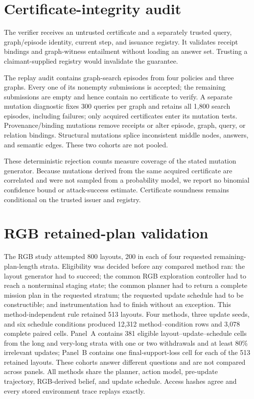 \documentclass{article}
\begin{document}
\section{Certificate-integrity audit}
\label{app:verifier-audit}

The verifier receives an untrusted certificate and a separately trusted query,
graph/episode identity, current step, and issuance registry. It validates
receipt bindings and graph-witness entailment without loading an answer set.
Trusting a claimant-supplied registry would invalidate the guarantee.

The replay audit contains \VerifierReplayEpisodes{} graph-search episodes from
four policies and three graphs. Every one of its
\VerifierReplayCertificates{} nonempty submissions is accepted; the remaining
submissions are empty and hence contain no certificate to verify. A separate
mutation diagnostic fixes 300 queries per graph and retains all 1,800 search
episodes, including failures; only acquired certificates enter its mutation
tests. Provenance/binding mutations remove receipts or alter episode, graph,
query, or relation bindings. Structural mutations splice inconsistent middle
nodes, answers, and semantic edges. These two cohorts are not pooled.



These deterministic rejection counts measure coverage of the stated mutation
generator. Because mutations derived from the same acquired certificate are
correlated and were not sampled from a probability model, we report no
binomial confidence bound or attack-success estimate. Certificate soundness
remains conditional on the trusted issuer and registry.

\section{RGB retained-plan validation}
\label{app:rgb-audit}

The RGB study attempted 800 layouts, 200 in each of four requested
remaining-plan-length strata. Eligibility was decided before any compared
method ran: the layout generator had to succeed; the common RGB exploration
controller had to reach a nonterminal staging state; the common planner had to
return a complete mission plan in the requested stratum; the requested update
schedule had to be constructible; and instrumentation had to finish without an
exception. This method-independent rule retained 513 layouts. Four methods,
three update seeds, and six schedule conditions produced 12,312 method--condition
rows and 3,078 complete paired cells. Panel~A contains 381 eligible
layout--update--schedule cells from the long and very-long strata with one or
two withdrawals and at least 80\% irrelevant updates; Panel~B contains one
final-support-loss cell for each of the 513 retained layouts. These cohorts
answer different questions and are not compared across panels. All methods
share the planner, action model, pre-update trajectory, RGB-derived belief, and
update schedule. Access hashes agree and every stored environment trace replays
exactly.
\end{document}
